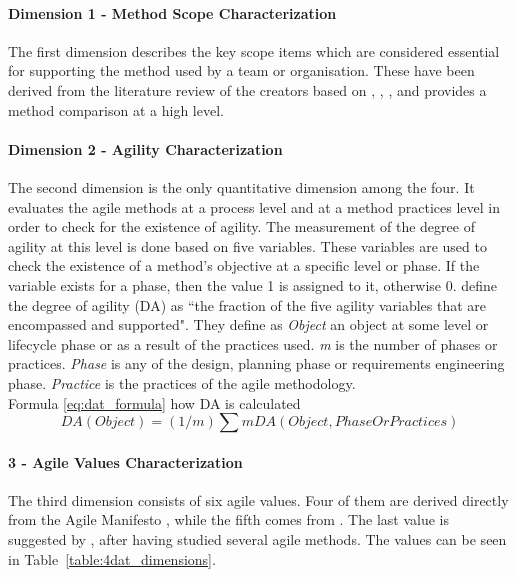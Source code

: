 \paragraph{Dimension 1 - Method Scope Characterization}
The first dimension describes the key scope items which are considered essential for supporting the method used by a team or organisation. These have been derived from the literature review of the creators based on \citet{Beck:2004:EPE:1076267}, \citet{koch2005agile}, \citet{Palmer:2001:PGF:600044}, \citet{Highsmith:2000:ASD:323922} and provides a method comparison at a high level.

\paragraph{Dimension 2 - Agility Characterization}
The second dimension is the only quantitative dimension among the four. It evaluates the agile methods at a process level and at a method practices level in order to check for the existence of agility. The measurement of the degree of agility at this level is done based on five variables. These variables are used to check the existence of a method's objective at a specific level or phase. If the variable exists for a phase, then the value 1 is assigned to it, otherwise 0. \citet{qumer2006measuring} define the degree of agility (DA) as ``the fraction of the five agility variables that are encompassed and supported". They define as \textit{Object} an object at some level or lifecycle phase or as a result of the practices used. \textit{m} is the number of phases or  practices. \textit{Phase} is any of the design, planning phase or requirements engineering phase. \textit{Practice} is the practices of the agile methodology. \\ %

Formula \eqref{eq:dat_formula} how DA is calculated\\
\begin{equation} \label{eq:dat_formula} DA (Object) = (1/m) \sum m DA(Object, Phase Or Practices) \end{equation}

\paragraph{3 - Agile Values Characterization}
The third dimension consists of six agile values. Four of them are derived directly from the Agile Manifesto \cite{beck2001agile}, while the fifth comes from \citet{koch2005agile}. The last value is suggested by \citet{qumer2006measuring}, after having studied several agile methods. The values can be seen in Table~\ref{table:4dat_dimensions}.

